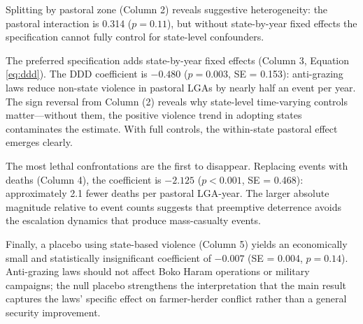 \documentclass[12pt]{article}
\begin{document}
Splitting by pastoral zone (Column 2) reveals suggestive heterogeneity: the pastoral interaction is 0.314 ($p = 0.11$), but without state-by-year fixed effects the specification cannot fully control for state-level confounders.

The preferred specification adds state-by-year fixed effects (Column 3, Equation \ref{eq:ddd}). The DDD coefficient is $-0.480$ ($p = 0.003$, SE = 0.153): anti-grazing laws reduce non-state violence in pastoral LGAs by nearly half an event per year. The sign reversal from Column (2) reveals why state-level time-varying controls matter---without them, the positive violence trend in adopting states contaminates the estimate. With full controls, the within-state pastoral effect emerges clearly.

The most lethal confrontations are the first to disappear. Replacing events with deaths (Column 4), the coefficient is $-2.125$ ($p < 0.001$, SE = 0.468): approximately 2.1 fewer deaths per pastoral LGA-year. The larger absolute magnitude relative to event counts suggests that preemptive deterrence avoids the escalation dynamics that produce mass-casualty events.

Finally, a placebo using state-based violence (Column 5) yields an economically small and statistically insignificant coefficient of $-0.007$ (SE = 0.004, $p = 0.14$). Anti-grazing laws should not affect Boko Haram operations or military campaigns; the null placebo strengthens the interpretation that the main result captures the laws' specific effect on farmer-herder conflict rather than a general security improvement.
\end{document}
